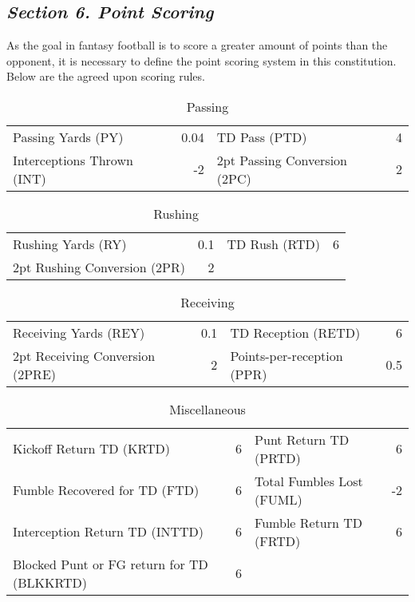 \documentclass{article}
\begin{document}
    \subsection{\textit{Section 6. Point Scoring}}
    As the goal in fantasy football is to score a greater amount of points than the opponent, it is necessary to define the point scoring system in this constitution. Below are the agreed upon scoring rules.
    \begin{table}[h]
        \caption{Passing}
        \begin{tabular}{lr|lr}
            \hline
            Passing Yards (PY) & 0.04 & TD Pass (PTD) & 4\\
            Interceptions Thrown (INT) & -2 & 2pt Passing Conversion (2PC) & 2\\
            \hline
        \end{tabular}
    \end{table}
    \begin{table}[h]
        \caption{Rushing}
        \begin{tabular}{lr|lr}
            \hline
            Rushing Yards (RY) & 0.1 & TD Rush (RTD) & 6\\
            2pt Rushing Conversion (2PR) & 2\\
            \hline
        \end{tabular}
    \end{table}
    \begin{table}[h]
        \caption{Receiving}
        \begin{tabular}{lr|lr}
            \hline
            Receiving Yards (REY) & 0.1 & TD Reception (RETD) & 6\\
            2pt Receiving Conversion (2PRE) & 2 & Points-per-reception (PPR) & 0.5\\
            \hline
        \end{tabular}
    \end{table}
    \begin{table}[h]
        \caption{Miscellaneous}
        \begin{tabular}{lr|lr}
            \hline
            Kickoff Return TD (KRTD) & 6 & Punt Return TD (PRTD) & 6\\
            Fumble Recovered for TD (FTD) & 6 & Total Fumbles Lost (FUML) & -2\\
            Interception Return TD (INTTD) & 6 & Fumble Return TD (FRTD) & 6\\
            Blocked Punt or FG return for TD (BLKKRTD) & 6\\
            \hline
        \end{tabular}
    \end{table}
\end{document}
